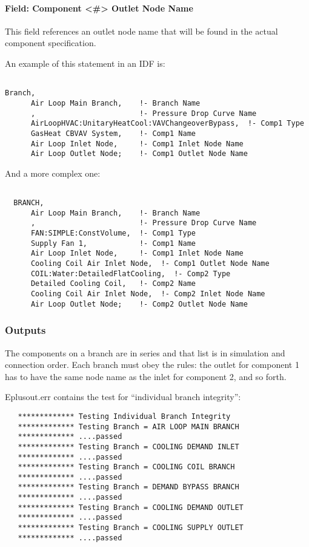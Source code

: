 \paragraph{Field: Component \textless{}\#\textgreater{} Outlet Node Name}\label{field-component-outlet-node-name}

This field references an outlet node name that will be found in the actual component specification.

An example of this statement in an IDF is:

\begin{lstlisting}

Branch,
      Air Loop Main Branch,    !- Branch Name
      ,                        !- Pressure Drop Curve Name
      AirLoopHVAC:UnitaryHeatCool:VAVChangeoverBypass,  !- Comp1 Type
      GasHeat CBVAV System,    !- Comp1 Name
      Air Loop Inlet Node,     !- Comp1 Inlet Node Name
      Air Loop Outlet Node;    !- Comp1 Outlet Node Name
\end{lstlisting}

And a more complex one:

\begin{lstlisting}

  BRANCH,
      Air Loop Main Branch,    !- Branch Name
      ,                        !- Pressure Drop Curve Name
      FAN:SIMPLE:ConstVolume,  !- Comp1 Type
      Supply Fan 1,            !- Comp1 Name
      Air Loop Inlet Node,     !- Comp1 Inlet Node Name
      Cooling Coil Air Inlet Node,  !- Comp1 Outlet Node Name
      COIL:Water:DetailedFlatCooling,  !- Comp2 Type
      Detailed Cooling Coil,   !- Comp2 Name
      Cooling Coil Air Inlet Node,  !- Comp2 Inlet Node Name
      Air Loop Outlet Node;    !- Comp2 Outlet Node Name
\end{lstlisting}

\subsubsection{Outputs}\label{outputs-2-014}

The components on a branch are in series and that list is in simulation and connection order. Each branch must obey the rules: the outlet for component 1 has to have the same node name as the inlet for component 2, and so forth.

Eplusout.err contains the test for ``individual branch integrity'':

\begin{lstlisting}
   ************* Testing Individual Branch Integrity
   ************* Testing Branch = AIR LOOP MAIN BRANCH
   ************* ....passed
   ************* Testing Branch = COOLING DEMAND INLET
   ************* ....passed
   ************* Testing Branch = COOLING COIL BRANCH
   ************* ....passed
   ************* Testing Branch = DEMAND BYPASS BRANCH
   ************* ....passed
   ************* Testing Branch = COOLING DEMAND OUTLET
   ************* ....passed
   ************* Testing Branch = COOLING SUPPLY OUTLET
   ************* ....passed
\end{lstlisting}

